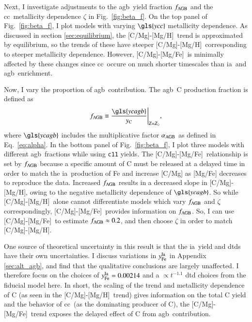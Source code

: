 \documentclass[12pt,oneside,letterpaper]{report}
\newcommand{\cc}{\gls{cc}}
\newcommand{\agb}{\gls{agb}}
\newcommand{\ia}{\gls{ia}}
\newcommand{\cxi}{\texttt{\gls{c11}}}
\newcommand{\Ycc}{\gls{ycc}}
\newcommand{\Ycagb}{\gls{ycagb}}
\newcommand{\Yct}{\ensuremath{y_{\rm C}}}
\newcommand{\caah}{[C/Mg]-[Mg/H]}
\newcommand{\caafe}{[C/Mg]-[Mg/Fe]}
\begin{document}
Next, I investigate adjustments to the \agb\ yield fraction $f_{\rm AGB}$ and the \cc\ metallicity dependence $\zeta$ in Fig.~\ref{fig:beta_f}. On the top panel of Fig.~\ref{fig:beta_f}, I plot models with varying $\Ycc$ metallicity dependence. As discussed in section \ref{sec:equilibrium}, the \caah~trend is approximated by equilibrium, so the trends of these have steeper \caah~corresponding to steeper metallicity dependence. However, \caafe~is minimally affected by these changes since \cc\ occure on much shorter timescales than \ia\ and \agb\ enrichment.

Now, I vary the proportion of \agb\ contribution.  The \agb\ C production fraction is defined as
\begin{equation}
    f_{\rm AGB} \equiv \frac{\Ycagb}{\Yct}\Bigg\vert_{Z=Z_\odot},
\end{equation}
where  $\Ycagb$ includes the multiplicative factor $\alpha_{\rm AGB}$ as defined in Eq.~\ref{eq:alpha}.
In the bottom panel of Fig.~\ref{fig:beta_f}, I plot three models with different \agb\ fractions while using \cxi{} yields.  The \caafe~relationship is set by $f_{\rm AGB}$ because a specific amount of C must be released at a delayed time in order to match the \ia\ production of Fe and increase [C/Mg] as [Mg/Fe] decreases to reproduce the data.
Increased $f_{\rm AGB}$ results in a decreased slope in \caah, owing to the negative metallicity dependence of $\Ycagb$. So while \caah~alone cannot differentiate models which vary $f_{\rm AGB}$ and $\zeta$ correspondingly, \caafe~provides information on $f_{\rm AGB}$. So, I can use \caafe~to estimate $f_{\rm AGB}\approx 0.2$, and then choose $\zeta$ in order to match \caah.

One source of theoretical uncertainty in this result is that the \ia\ yield and \gls{dtd}s have their own uncertainties. I discuss variations in $y_{\rm Fe}^{\rm Ia}$ in Appendix \ref{sec:alt_agb}, and find that the qualitative conclusions are largely unaffected. I therefore focus on the choices of $y_{\rm Fe}^{\rm Ia} = 0.00214$ and a $\propto t^{-1.1}$ \gls{dtd} choices from the fiducial model here.
In short, the scaling of the trend and metallicity dependence of C (as seen in
the \caah\ trend) gives information on the total C yield and the behavior of \cc\ (as the dominating producer of C), the \caafe\ trend exposes the delayed effect of C from \agb\ contribution.
\end{document}
